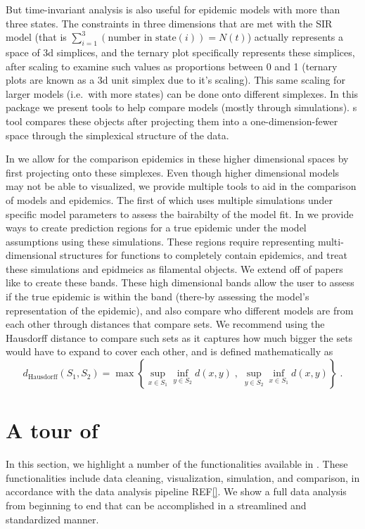 \documentclass[
  shortnames]{jss}
\begin{document}
But time-invariant analysis is also useful for epidemic models with more
than three states. The constraints in three dimensions that are met with
the SIR model (that is
\(\sum_{i=1}^3 (\text{number in state}(i)) = N(t)\)) actually represents
a space of 3d simplices, and the ternary plot specifically represents
these simplices, after scaling to examine such values as proportions
between 0 and 1 (ternary plots are known as a 3d unit simplex due to
it's scaling). This same scaling for larger models (i.e.~with more
states) can be done onto different simplexes. In this package we present
tools to help compare models (mostly through simulations). s tool
compares these objects after projecting them into a one-dimension-fewer
space through the simplexical structure of the data.

In  we allow for the comparison epidemics in these
higher dimensional spaces by first projecting onto these simplexes. Even
though higher dimensional models may not be able to visualized, we
provide multiple tools to aid in the comparison of models and epidemics.
The first of which uses multiple simulations under specific model
parameters to assess the bairabilty of the model fit. In
 we provide ways to create prediction regions for a true
epidemic under the model assumptions using these simulations. These
regions require representing multi-dimensional structures for functions
to completely contain epidemics, and treat these simulations and
epidmeics as filamental objects. We extend off of papers like
\citet{Dalmasso2019a} to create these bands. These high dimensional
bands allow the user to assess if the true epidemic is within the band
(there-by assessing the model's representation of the epidemic), and
also compare who different models are from each other through distances
that compare sets. We recommend using the Hausdorff distance to compare
such sets as it captures how much bigger the sets would have to expand
to cover each other, and is defined mathematically as \[
d_\text{Hausdorff}(S_1, S_2) = \max \left\{ \sup_{x \in S_1} \inf_{y \in S_2} d(x,y) \;,\; \sup_{y \in S_2} \inf_{x \in S_1} d(x,y)\right\}\;.
\]

\section[Tour]{A tour of }\label{sec:tour}

In this section, we highlight a number of the functionalities available
in . These functionalities include data cleaning,
visualization, simulation, and comparison, in accordance with the data
analysis pipeline REF\ref{}. We show a full data analysis from beginning
to end that can be accomplished in a streamlined and standardized
manner.
\end{document}
